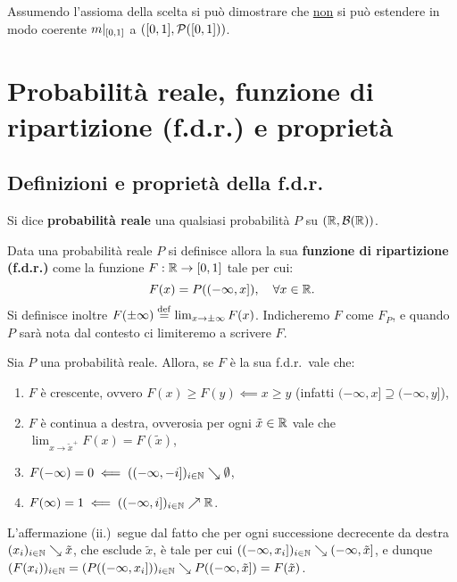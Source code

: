 \begin{multicols*}{2}
\begin{remark}
    Assumendo l'assioma della scelta si può dimostrare che \underline{non} si può estendere in modo coerente
    $m\arrowvert_{[0,1]}$ a $([0, 1], \mathcal{P}([0, 1]))$.
\end{remark}

\section{Probabilità reale, funzione di ripartizione (f.d.r.) e proprietà}

\subsection{Definizioni e proprietà della f.d.r.}

\begin{definition}
    Si dice \textbf{probabilità reale} una qualsiasi
    probabilità $P$ su $(\mathbb{R}, \mathcal{B}(\mathbb{R}))$.
\end{definition}

\begin{definition}
    Data una probabilità reale $P$ si definisce
    allora la sua \textbf{funzione di ripartizione (f.d.r.)}
    come la funzione $F : \mathbb{R} \to [0, 1]$ tale per cui:
    \[
        F(x) = P((-\infty, x]), \quad \forall x \in \mathbb{R}.
    \]
    Si definisce inoltre $F(\pm\infty) \overset{\mathrm{def}}{=} \lim_{x \to \pm\infty} F(x)$.
    Indicheremo $F$ come $F_P$, e quando $P$ sarà nota dal contesto
    ci limiteremo a scrivere $F$.
\end{definition}

\begin{proposition}
    Sia $P$ una probabilità reale. Allora, se $F$ è la
    sua f.d.r.~vale che:
    \begin{enumerate}[(i.)]
        \item $F$ è crescente, ovvero $F(x) \geq F(y) \impliedby x \geq y$ (infatti $(-\infty, x] \supseteq (-\infty, y]$),
        \item $F$ è continua a destra, ovverosia per ogni $\tilde{x} \in \mathbb{R}$ vale che $\lim_{x \to \tilde{x}^+} F(x) = F(\tilde{x})$,
        \item $F(-\infty) = 0 \impliedby ((-\infty, -i])_{i \in \mathbb{N}} \searrow \emptyset$,
        \item $F(\infty) = 1 \impliedby ((-\infty, i])_{i \in \mathbb{N}} \nearrow \mathbb{R}$.
    \end{enumerate}


    L'affermazione (ii.)~segue dal fatto che per ogni successione decrecente da destra $(x_i)_{i \in \mathbb{N}} \searrow \tilde{x}$,
    che esclude $\tilde{x}$, è
    tale per cui $((-\infty, x_i])_{i \in \mathbb{N}} \searrow (-\infty, \tilde{x}]$, e dunque
    $(F(x_i))_{i \in \mathbb{N}} = (P((-\infty, x_i]))_{i \in \mathbb{N}} \searrow P((-\infty, \tilde{x}]) = F(\tilde{x})$.
\end{proposition}


\end{multicols*}
